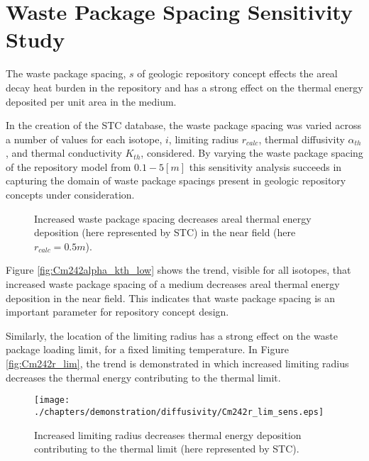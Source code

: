 \section{Waste Package Spacing Sensitivity Study}\label{sec:spacing}
The waste package spacing, $s$ of geologic repository concept effects the areal 
decay heat burden in the repository and has a strong effect on the thermal 
energy deposited per unit area in the medium. 

In the creation of the \gls{STC} database, the waste package spacing was varied 
across a number of values for each isotope, $i$, limiting 
radius $r_{calc}$, thermal diffusivity $\alpha_{th}$, and thermal conductivity $K_{th}$, considered.  By 
varying the waste package spacing of the repository model from $0.1-5 [m]$
this sensitivity analysis succeeds in capturing the domain of 
waste package spacings present in geologic repository concepts under 
consideration. 

\begin{figure}[htbp!]
\begin{center}
\end{center}
\caption[$K_{th}$ Sensitivity to $s$]{Increased waste package 
spacing decreases areal thermal energy deposition 
(here represented by \gls{STC}) in the near field (here $r_{calc} = 0.5m$).}
\label{fig:Cm242spacing}
\end{figure}

Figure \ref{fig:Cm242alpha_kth_low} shows the trend, visible for all isotopes, 
that increased waste package spacing of a medium decreases areal thermal energy 
deposition in the near field. This indicates that waste package spacing is 
an important parameter for repository concept design.

Similarly, the location of the limiting radius has a strong effect on the 
waste package loading limit, for a fixed limiting temperature. In Figure 
\ref{fig:Cm242r_lim}, the trend is demonstrated in which increased limiting 
radius decreases the thermal energy contributing to the thermal limit. 


\begin{figure}[htbp!]
\begin{center}
\texttt{[image: ./chapters/demonstration/diffusivity/Cm242r\_lim\_sens.eps]}
\end{center}
\caption[$K_{th}$ Sensitivity to $r_{lim}$]{Increased limiting radius 
decreases thermal energy deposition contributing to the thermal limit
(here represented by \gls{STC}).}
\label{fig:Cm242r_lim_sens}
\end{figure}
